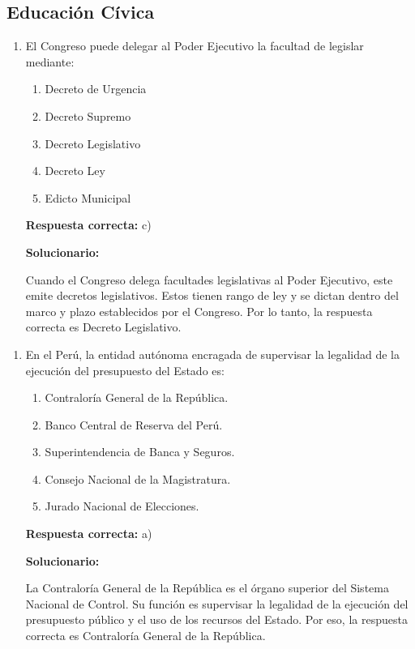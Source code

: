 \subsection*{Educación Cívica}


\begin{enumerate}
	
	\item El Congreso puede delegar al Poder Ejecutivo la facultad de legislar mediante:
	
	\begin{enumerate}[label=\alph*)]
		\item Decreto de Urgencia
		\item Decreto Supremo
		\item Decreto Legislativo
		\item Decreto Ley
		\item Edicto Municipal
	\end{enumerate}
	
	\textbf{Respuesta correcta:} c)
	
	\vspace{2mm}
	\textbf{Solucionario:}
	
	Cuando el Congreso delega facultades legislativas al Poder Ejecutivo, este emite decretos legislativos. Estos tienen rango de ley y se dictan dentro del marco y plazo establecidos por el Congreso. Por lo tanto, la respuesta correcta es Decreto Legislativo.
	
\end{enumerate}

\begin{enumerate}[resume]
	
	\item En el Perú, la entidad autónoma encragada de supervisar la legalidad de la ejecución del presupuesto del Estado es:
	
	\begin{enumerate}[label=\alph*)]
		\item Contraloría General de la República.
		\item Banco Central de Reserva del Perú.
		\item Superintendencia de Banca y Seguros.
		\item Consejo Nacional de la Magistratura.
		\item Jurado Nacional de Elecciones.
	\end{enumerate}
	
	\textbf{Respuesta correcta:} a)
	
	\vspace{2mm}
	\textbf{Solucionario:}
	
	La Contraloría General de la República es el órgano superior del Sistema Nacional de Control. Su función es supervisar la legalidad de la ejecución del presupuesto público y el uso de los recursos del Estado. Por eso, la respuesta correcta es Contraloría General de la República.
	
\end{enumerate}


